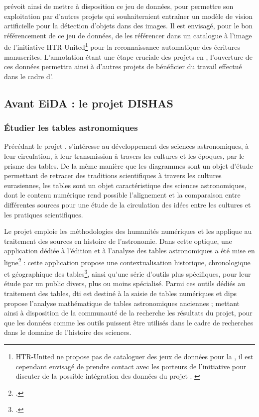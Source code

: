 \eida prévoit ainsi de mettre à disposition ce jeu de données, pour permettre son exploitation par d'autres projets qui souhaiteraient entraîner un modèle de vision artificielle pour la détection d'objets dans des images. Il est envisagé, pour le bon référencement de ce jeu de données, de les référencer dans un catalogue à l'image de l'initiative HTR-United\footnote{HTR-United ne propose pas de cataloguer des jeux de données pour la \cv, il est cependant envisagé de prendre contact avec les porteurs de l'initiative pour discuter de la possible intégration des données du projet \eida. \cite{chagueHTRUnited}} pour la reconnaissance automatique des écritures manuscrites. L'annotation étant une étape cruciale des projets en \ml, l'ouverture de ces données permettra ainsi à d'autres projets de bénéficier du travail effectué dans le cadre d'\eida.

    \subsection{Avant EiDA : le projet DISHAS}
        \subsubsection{Étudier les tables astronomiques}
Précédant le projet \eida, \dishas s’intéresse au développement des sciences astronomiques, à leur circulation, à leur transmission à travers les cultures et les époques, par le prisme des tables. De la même manière que les diagrammes sont un objet d’étude permettant de retracer des traditions scientifiques à travers les cultures eurasiennes, les tables sont un objet caractéristique des sciences astronomiques, dont le contenu numérique rend possible l’alignement et la comparaison entre différentes sources pour une étude de la circulation des idées entre les cultures et les pratiques scientifiques.

Le projet \dishas emploie les méthodologies des humanités numériques et les applique au traitement des sources en histoire de l’astronomie. Dans cette optique, une application dédiée à l’édition et à l’analyse des tables astronomiques a été mise en ligne\footcite{HomeDISHASProject} : cette application propose une contextualisation historique, chronologique et géographique des tables\footcite{HistoricalNavigationDISHAS}, ainsi qu’une série d’outils plus spécifiques, pour leur étude par un public divers, plus ou moins spécialisé. Parmi ces outils dédiés au traitement des tables, \acrfull{dti} est destiné à la saisie de tables numériques et \acrfull{dips} propose l’analyse mathématique de tables astronomiques anciennes ; mettant ainsi à disposition de la communauté de la recherche les résultats du projet, pour que les données comme les outils puissent être utilisés dans le cadre de recherches dans le domaine de l’histoire des sciences. 

